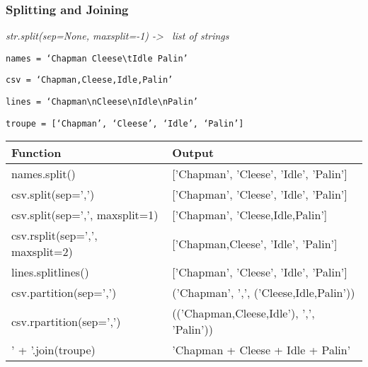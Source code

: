 \documentclass{beamer}
\begin{document}
%
%
\begin{frame}
  \frametitle{Splitting and Joining}

  \textit{str.split(sep=None, maxsplit=-1) -\textgreater~ list of strings}

  \texttt{names = `Chapman Cleese\textbackslash tIdle      Palin'}

  \texttt{csv = `Chapman,Cleese,Idle,Palin'}

  \texttt{lines = `Chapman\textbackslash nCleese\textbackslash nIdle\textbackslash nPalin'}

  \texttt{troupe = [`Chapman', `Cleese', `Idle', `Palin']}
  
  \begin{table}
    \begin{tabular}{l | l}
    Function & Output \\
    \hline
    names.split() & ['Chapman', 'Cleese', 'Idle', 'Palin'] \\
    csv.split(sep=',') & ['Chapman', 'Cleese', 'Idle', 'Palin'] \\
    csv.split(sep=',', maxsplit=1) & ['Chapman', 'Cleese,Idle,Palin'] \\
    csv.rsplit(sep=',', maxsplit=2) & ['Chapman,Cleese', 'Idle', 'Palin'] \\
    lines.splitlines() & ['Chapman', 'Cleese', 'Idle', 'Palin'] \\
    csv.partition(sep=',') & ('Chapman', ',', ('Cleese,Idle,Palin')) \\
    csv.rpartition(sep=',') & (('Chapman,Cleese,Idle'), ',', 'Palin')) \\
     \hline
    ' + '.join(troupe) & 'Chapman + Cleese + Idle + Palin'
    \end{tabular}
  \end{table}
\end{frame}
\end{document}
